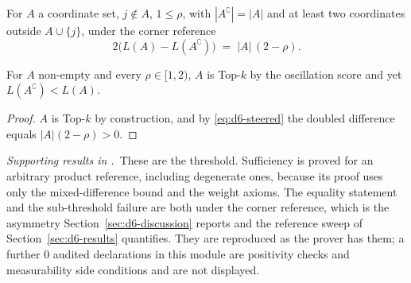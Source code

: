 \begin{theorem}
\label{thm:d6-steered}
For $A$ a coordinate set, $j\notin A$, $1\le\rho$, with $|A^{\complement}|=|A|$ and at least
two coordinates outside $A\cup\{j\}$, under the corner reference
\begin{equation}
2\bigl(L(A)-L(A^{\complement})\bigr)\;=\;|A|\,(2-\rho).
\label{eq:d6-steered}
\end{equation}
\end{theorem}


\begin{theorem}
\label{thm:d6-subthreshold}
For $A$ non-empty and every $\rho\in[1,2)$, $A$ is Top-$k$ by the oscillation score and yet
$L(A^{\complement})<L(A)$.
\end{theorem}

\begin{proof}
$A$ is Top-$k$ by construction, and by \eqref{eq:d6-steered} the doubled difference equals
$|A|(2-\rho)>0$.
\end{proof}


\noindent\emph{Supporting results in .}~These are the threshold. Sufficiency is proved for an arbitrary product reference, including degenerate ones, because its proof uses only the mixed-difference bound and the weight axioms. The equality statement and the sub-threshold failure are both under the corner reference, which is the asymmetry Section~\ref{sec:d6-discussion} reports and the reference sweep of Section~\ref{sec:d6-results} quantifies. They are reproduced as the prover has them; a further $0$ audited declarations in this module are positivity checks and measurability side conditions and are not displayed.

